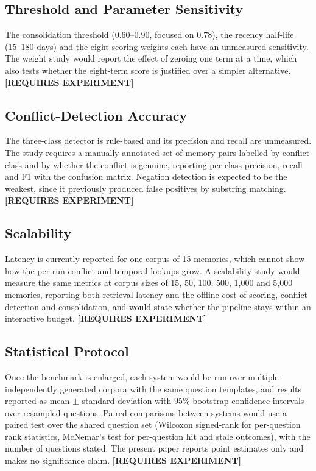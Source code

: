\documentclass[conference]{IEEEtran}
\begin{document}
\subsection{Threshold and Parameter Sensitivity}
The consolidation threshold (0.60--0.90, focused on 0.78), the recency half-life (15--180 days) and the eight scoring weights each have an unmeasured sensitivity. The weight study would report the effect of zeroing one term at a time, which also tests whether the eight-term score is justified over a simpler alternative. \textbf{[REQUIRES EXPERIMENT]}
\subsection{Conflict-Detection Accuracy}
The three-class detector is rule-based and its precision and recall are unmeasured. The study requires a manually annotated set of memory pairs labelled by conflict class and by whether the conflict is genuine, reporting per-class precision, recall and F1 with the confusion matrix. Negation detection is expected to be the weakest, since it previously produced false positives by substring matching. \textbf{[REQUIRES EXPERIMENT]}
\subsection{Scalability}
Latency is currently reported for one corpus of 15 memories, which cannot show how the per-run conflict and temporal lookups grow. A scalability study would measure the same metrics at corpus sizes of 15, 50, 100, 500, 1,000 and 5,000 memories, reporting both retrieval latency and the offline cost of scoring, conflict detection and consolidation, and would state whether the pipeline stays within an interactive budget. \textbf{[REQUIRES EXPERIMENT]}
\subsection{Statistical Protocol}
Once the benchmark is enlarged, each system would be run over multiple independently generated corpora with the same question templates, and results reported as mean $\pm$ standard deviation with 95\% bootstrap confidence intervals over resampled questions. Paired comparisons between systems would use a paired test over the shared question set (Wilcoxon signed-rank for per-question rank statistics, McNemar's test for per-question hit and stale outcomes), with the number of questions stated. The present paper reports point estimates only and makes no significance claim. \textbf{[REQUIRES EXPERIMENT]}
\end{document}
